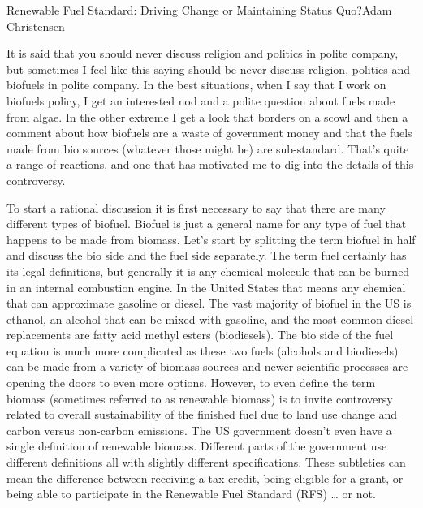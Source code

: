 \documentclass[10pt]{papertex}
\begin{document}
\makeatletter
\renewcommand{\papertex@headDateTime}{
    \raisebox{-5pt}
    {\fontsize{5mm}{6mm}\usefont{T1}{bch}{b}{n}{April 2014}}
    }
\makeatother

\begin{news}{2}{Renewable Fuel Standard: Driving Change or Maintaining Status 
    Quo?}{Adam Christensen}{}{}

It is said that you should never discuss religion and politics in polite 
company, but sometimes I feel like this saying should be never discuss 
religion, politics and biofuels in polite company. In the best situations, 
when I say that I work on biofuels policy, I get an interested nod and a 
polite question about fuels made from algae. In the other extreme I get a 
look that borders on a scowl and then a comment about how biofuels are a 
waste of government money and that the fuels made from bio sources (whatever 
those might be) are sub-standard. That’s quite a range of reactions, and one 
that has motivated me to dig into the details of this controversy.

To start a rational discussion it is first necessary to say that there are many 
different types of biofuel. Biofuel is just a general name for any type of fuel 
that happens to be made from biomass. Let’s start by splitting the term biofuel 
in half and discuss the bio side and the fuel side separately. The term fuel 
certainly has its legal definitions, but generally it is any chemical molecule 
that can be burned in an internal combustion engine. In the United States that 
means any chemical that can approximate gasoline or diesel. The vast majority 
of biofuel in the US is ethanol, an alcohol that can be mixed with gasoline, 
and the most common diesel replacements are fatty acid methyl esters 
(biodiesels). The bio side of the fuel equation is much more complicated as 
these two fuels (alcohols and biodiesels) can be made from a variety of biomass 
sources and newer scientific processes are opening the doors to even more 
options. However, to even define the term biomass (sometimes referred to as 
renewable biomass) is to invite controversy related to overall sustainability 
of the finished fuel due to land use change and carbon versus non-carbon 
emissions. The US government doesn’t even have a single definition of 
renewable biomass. Different parts of the government use different definitions 
all with slightly different specifications. These subtleties can mean the 
difference between receiving a tax credit, being eligible for a grant, or 
being able to participate in the Renewable Fuel Standard (RFS) … or not.



\end{news}
\end{document}
